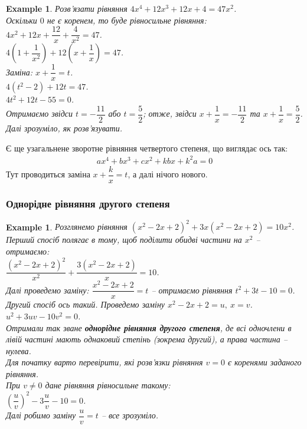 \documentclass[a4paper, 10pt]{article}
\theoremstyle{theoremdd}
\theoremstyle{theoremdd}
\theoremstyle{theoremdd}
\theoremstyle{theoremdd}
\newtheorem{example}[theorem]{Example}
\theoremstyle{theoremdd}
\theoremstyle{theoremdd}
\theoremstyle{theoremdd}
\theoremstyle{theoremdd}
\begin{document}
\begin{example}
Розв'язати рівняння $4x^4 + 12x^3 + 12x + 4 = 47x^2$.\\
Оскільки $0$ не є коренем, то буде рівносильне рівняння:\\
$4x^2 + 12x + \dfrac{12}{x} + \dfrac{4}{x^2} = 47$.\\
$4 \left( 1 + \dfrac{1}{x^2} \right) + 12 \left( x + \dfrac{1}{x} \right) = 47$.\\
Заміна: $x + \dfrac{1}{x} = t$.\\
$4 (t^2 - 2) + 12t = 47$.\\
$4t^2 + 12t -55 = 0$.\\
Отримаємо звідси $t = -\dfrac{11}{2}$ або $t = \dfrac{5}{2}$; отже, звідси $x + \dfrac{1}{x} = -\dfrac{11}{2}$ та $x + \dfrac{1}{x} = \dfrac{5}{2}$. Далі зрозуміло, як розв'язувати.
\end{example}

Є ще узагальнене зворотне рівняння четвертого степеня, що виглядає ось так:
\begin{align*}
ax^4 + bx^3 + cx^2 + kbx + k^2a = 0
\end{align*}
Тут проводиться заміна $x + \dfrac{k}{x} = t$, а далі нічого нового.

\subsubsection{Однорідне рівняння другого степеня}
\begin{example}
Розглянемо рівняння $(x^2-2x+2)^2 + 3x(x^2-2x+2) = 10x^2$.\\
Перший спосіб полягає в тому, щоб поділити обидві частини на $x^2$ -- отримаємо:\\
$\dfrac{(x^2-2x+2)^2}{x^2} + \dfrac{3(x^2-2x+2)}{x} = 10$.\\
Далі проведемо заміну: $\dfrac{x^2-2x+2}{x} = t$ -- отримаємо рівняння $t^2+3t-10=0$.
\bigskip \\
Другий спосіб ось такий. Проведемо заміну $x^2 - 2x + 2 = u,\ x = v$.\\
$u^2 + 3uv - 10v^2 = 0$.\\
Отримали так зване \textbf{однорідне рівняння другого степеня}, де всі одночлени в лівій частині мають однаковий степінь (зокрема другий), а права частина -- нулева.\\
Для початку варто перевірити, які розв'язки рівняння $v=0$ є коренями заданого рівняння.\\
При $v \neq 0$ дане рівняння рівносильне такому:\\
$\left( \dfrac{u}{v} \right)^2 - 3 \dfrac{u}{v} - 10 = 0$.\\
Далі робимо заміну $\dfrac{u}{v} = t$ -- все зрозуміло.
\end{example}
\end{document}
